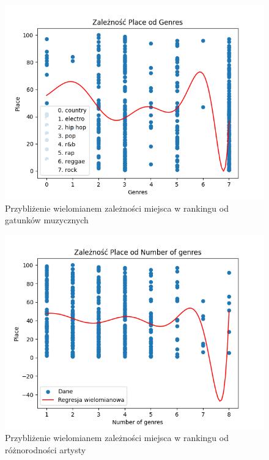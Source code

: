 \documentclass[12pt, letterpaper]{article}
\begin{document}
\begin{figure}[h]
    \centering
    \includegraphics[width=1\textwidth]{place_genres_graph}  
    \caption{Przybliżenie wielomianem zależności miejsca w rankingu od gatunków muzycznych}
\end{figure}

\begin{figure}[h]
    \centering
    \includegraphics[width=1\textwidth]{place_number_of_genres_graph}  
    \caption{Przybliżenie wielomianem zależności miejsca w rankingu od różnorodności artysty}
\end{figure}
\end{document}
